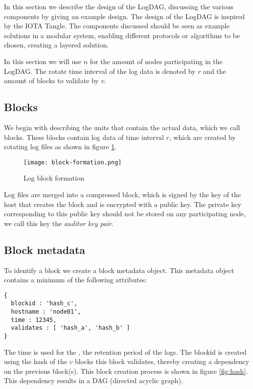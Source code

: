 In this section we describe the design of the LogDAG,
discussing the various components by giving an example design.
The design of the LogDAG is inspired by the IOTA Tangle\cite{popov2016tangle}.
The components discussed should be
seen as example solutions in a modular system,
enabling different protocols or algorithms to be chosen,
creating a layered solution.

In this section we will use $n$ for the amount of nodes participating in the LogDAG.
The rotate time interval of the log data is denoted by $r$
and the amount of blocks to validate by $v$.

\subsection{Blocks}
We begin with describing the units that contain the actual data,
which we call blocks.
These blocks contain log data of time interval $r$,
which are created by rotating log files
as shown in figure \ref{fig:formation}.

\begin{figure}[H]
\centering \texttt{[image: block-formation.png]}
\caption{ \label{fig:formation}  
Log block formation
}
\end{figure}

Log files are merged into a compressed block,
which is signed by the key of the host that creates the block
and is encrypted with a public key.
The private key corresponding to this public key should not be stored on any participating node,
we call this key the \textit{auditor key pair}.

\subsection{Block metadata}\label{metadata}

To identify a block we create a block metadata object.
This metadata object contains a minimum of the following attributes:

\begin{lstlisting}
{
  blockid : 'hash_c',
  hostname : 'node01',
  time : 12345,
  validates : [ 'hash_a', 'hash_b' ]
}
\end{lstlisting}

The time is used for the \ttl,
the retention period of the logs.
The blockid is created using the hash of the $v$ blocks this block validates,
thereby creating a dependency on the previous block(s).
This block creation process is shown in figure \ref{fig:hash}.
This dependency results in a DAG (directed acyclic graph).

